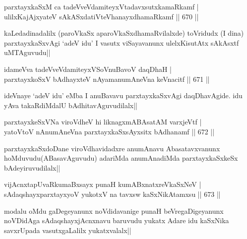 \begin{shl}
parxtayxkaSxM ca tadeVveVdamiteyxVtadavxsutxkamaRkamf | \\
ulilxKajAjxyateV sAkASxdatiVteV\s hanayxdhamaRkamf \hfill||  670 ||  
\end{shl}

\begin{artha}
kaLedadinadalilx (paroVkaSx aparoVkaSxdhamaRvilalxde) toVridudx (I dina) parxtayxkaSxvAgi `adeV idu' I vasutx viSayavanunx ulelxKisutAtx sAkAsxtf uMTAguvudu||
\end{artha}


\begin{shl}
idameVva tadeVveVdamiteyxVSoV\s nuBavoV daqDhaH | \\
parxtayxkoSxV bAdhayxteV nAyamanumAneVna keVnacitf \hfill||  671 ||  
\end{shl}

\begin{artha}
ideVnaye `adeV idu' eMba I anuBavavu parxtayxkaSxvAgi daqDhavAgide. idu yAva takaRdiMdalU bAdhitavAguvudilalx||
\end{artha}


\begin{shl}
parxtayxkeSxVNa viroVdheV hi liknagxmABAsatAM varxjeVtf | \\
yatoV\s toV nAnumAneVna parxtayxkaSxsAyxsitx bAdhanamf \hfill||  672 ||  
\end{shl}

\begin{artha}
parxtayxkaSxdoDane viroVdhavidadxre anumAnavu Abasatavxvanunx hoMduvudu(ABasavAguvudu) adariMda anumAnadiMda parxtayxkaSxkeSx bAdeyiruvudilalx||
\end{artha}


\begin{shl}
vijAcnxtapUvaRkumaBxsayx punaH kumABxnatxreVkaSxNeV | \\
sAdaqshayxparxtayxyoV yukotxV na tavxsw kaSxNikAtamxsu \hfill||  673 ||  
\end{shl}

\begin{artha}
modalu oMdu gaDegeyanunx noVdidavanige punaH beVregaDigeyanunx noVDidAga sAdaqshayxjAcnxnavu baruvudu yukatx Adare idu kaSxNika savxrUpada vasutxgaLalilx yukatxvalalx||
\end{artha}

